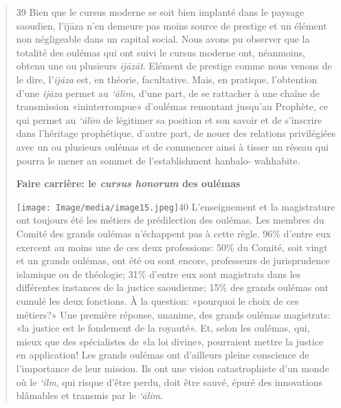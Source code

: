 \begin{quote}
39 Bien que le cursus moderne se soit bien implanté dans le paysage
saoudien, l'ijāza
n'en demeure pas moins source de prestige et un élément non négligeable
dans un
capital social. Nous avons pu observer que la totalité des oulémas qui
ont suivi le cursus moderne ont, néanmoins, obtenu une ou plusieurs
\emph{ijāzāt}. Elément de prestige comme nous venons de le dire,
l'\emph{ijāza} est, en théorie, facultative. Mais, en pratique,
l'obtention d'une \emph{ijāza} permet au \emph{`ālim}, d'une part, de se
rattacher à une chaîne de transmission
«ininterrompue» d'oulémas remontant jusqu'au Prophète, ce qui permet au
\emph{`ālim} de légitimer sa position et son savoir et de s'inscrire
dans l'héritage prophétique, d'autre part, de nouer des relations
privilégiées avec un ou plusieurs oulémas et de commencer ainsi à tisser
un réseau qui pourra le mener au sommet de l'establishment hanbalo-
wahhabite.

\textbf{Faire carrière: le \emph{cursus honorum} des oulémas}

\texttt{[image: Image/media/image15.jpeg]}40
L'enseignement et la magistrature ont toujours été les métiers de
prédilection des oulémas. Les membres du Comité des grands oulémas
n'échappent pas à cette règle. 96\% d'entre eux exercent au moins une de
ces deux professions: 50\% du Comité, soit vingt et un grands oulémas,
ont été ou sont encore, professeurs de jurisprudence islamique ou de
théologie; 31\% d'entre eux sont magistrats dans les différentes
instances de la justice saoudienne; 15\% des grands oulémas ont cumulé
les deux fonctions. À la question: «pourquoi le choix de ces métiers?»
Une première réponse, unanime, des grands oulémas magistrats: «la
justice est le fondement de la royauté». Et, selon les oulémas, qui,
mieux que des spécialistes de «la loi divine», pourraient mettre la
justice en application! Les grands oulémas ont d'ailleurs pleine
conscience de l'importance de leur mission. Ils ont une vision
catastrophiste d'un monde où le \emph{`ilm}, qui risque d'être perdu,
doit être sauvé, épuré des innovations blâmables et transmis par le
\emph{`ālim}.


\end{quote}
